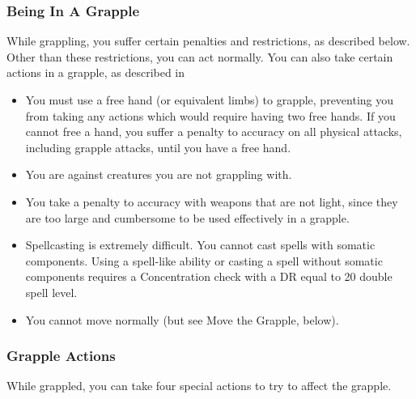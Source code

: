         \subsubsection{Being In A Grapple}
            While grappling, you suffer certain penalties and restrictions, as described below. Other than these restrictions, you can act normally. You can also take certain actions in a grapple, as described in 
            \begin{itemize}
                \item You must use a free hand (or equivalent limbs) to grapple, preventing you from taking any actions which would require having two free hands. If you cannot free a hand, you suffer a  penalty to accuracy on all physical attacks, including grapple attacks, until you have a free hand.
                \item You are  against creatures you are not grappling with.
                \item You take a  penalty to accuracy with weapons that are not light, since they are too large and cumbersome to be used effectively in a grapple.
                \item Spellcasting is extremely difficult. You cannot cast spells with somatic components. Using a spell-like ability or casting a spell without somatic components requires a Concentration check with a DR equal to 20 \add double spell level.
                \item You cannot move normally (but see Move the Grapple, below).
            \end{itemize}

        \subsubsection{Grapple Actions}\label{Grapple Actions}
            While grappled, you can take four special actions to try to affect the grapple.

